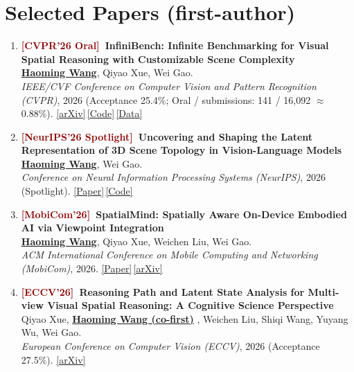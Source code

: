 \documentclass[11pt, letterpaper]{article}
\newenvironment{publist}{
  \begin{enumerate}[leftmargin=1.7em, itemsep=4pt, parsep=0pt, topsep=2pt,
                    label=\arabic*., ref=\arabic*, series=pubs]
}{\end{enumerate}}
\newcommand{\me}{\underline{\textbf{Haoming Wang}}}
\newcommand{\meco}{\underline{\textbf{Haoming Wang (co-first)}} }
\begin{document}
\section{Selected Papers (first-author)}

\begin{publist}
\item\label{pub:infinibench} \textbf{\textcolor{darkred}{[CVPR'26 Oral]}\ InfiniBench: Infinite Benchmarking for Visual Spatial Reasoning with Customizable Scene Complexity}\\
\me, Qiyao Xue, Wei Gao.\\
\textit{IEEE/CVF Conference on Computer Vision and Pattern Recognition (CVPR)}, 2026 (Acceptance 25.4\%; Oral / submissions: 141 / 16,092 $\approx$ 0.88\%). \href{https://arxiv.org/abs/2511.18200}{[arXiv]}\,\href{https://github.com/pittisl/infinibench}{[Code]}\,\href{https://huggingface.co/datasets/Haoming645/infinibench}{[Data]}


\item\label{pub:vlmlatent} \textbf{\textcolor{darkred}{[NeurIPS'26 Spotlight]}\ Uncovering and Shaping the Latent Representation of 3D Scene Topology in Vision-Language Models}\\
\me, Wei Gao.\\
\textit{Conference on Neural Information Processing Systems (NeurIPS)}, 2026 (Spotlight). \href{https://haomingwang645.github.io/pdfs/arxiv26_vlm_latent_shaping.pdf}{[Paper]}\,\href{https://github.com/pittisl/vlm-latent-shaping}{[Code]}

\item\label{pub:mosaic} \textbf{\textcolor{darkred}{[MobiCom'26]}\ SpatialMind: Spatially Aware On-Device Embodied AI via Viewpoint Integration}\\
\me, Qiyao Xue, Weichen Liu, Wei Gao.\\
\textit{ACM International Conference on Mobile Computing and Networking (MobiCom)}, 2026. \href{https://mobicom26.hotcrp.com/paper/1215}{[Paper]}\,\href{https://www.arxiv.org/abs/2602.07082}{[arXiv]}

\item\label{pub:remindview} \textbf{\textcolor{darkred}{[ECCV'26]}\ Reasoning Path and Latent State Analysis for Multi-view Visual Spatial Reasoning: A Cognitive Science Perspective}\\
Qiyao Xue, \meco, Weichen Liu, Shiqi Wang, Yuyang Wu, Wei Gao.\\
\textit{European Conference on Computer Vision (ECCV)}, 2026 (Acceptance 27.5\%). \href{https://arxiv.org/abs/2512.02340}{[arXiv]}


\end{publist}
\end{document}
